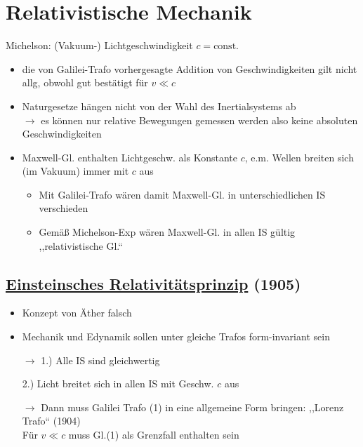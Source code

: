 \documentclass[titlepage,12pt,a4paper,ngerman]{report}
\newcommand{\tx}[1]{\textrm{#1}}
\newcommand{\const}{\tx{const.}}
\begin{document}

\section{Relativistische Mechanik}
Michelson: (Vakuum-) Lichtgeschwindigkeit $ c = \const $
\begin{itemize}
	\item die von Galilei-Trafo vorhergesagte Addition von Geschwindigkeiten gilt nicht allg, obwohl gut bestätigt für $ v \ll c $
	\item Naturgesetze hängen nicht von der Wahl des Inertialsystems ab\\
	$ \rightarrow $ es können nur relative Bewegungen gemessen werden also keine absoluten Geschwindigkeiten
	\item Maxwell-Gl. enthalten Lichtgeschw. als Konstante $ c $, e.m. Wellen breiten sich (im Vakuum) immer mit $ c $ aus
	\begin{itemize}
		\item Mit Galilei-Trafo wären damit Maxwell-Gl. in unterschiedlichen IS verschieden
		\item Gemäß Michelson-Exp wären Maxwell-Gl. in allen IS gültig ,,relativistische Gl.``
	\end{itemize}
\end{itemize}
\subsection{\underline{Einsteinsches Relativitätsprinzip} (1905)}
\begin{itemize}
	\item Konzept von Äther falsch
	\item Mechanik und Edynamik sollen unter gleiche Trafos form-invariant sein
\end{itemize}
\begin{enumerate}
	\item[$ \rightarrow $ 1.)] Alle IS sind gleichwertig
	\item[2.)] Licht breitet sich in allen IS mit Geschw. $ c $ aus
\end{enumerate}
\begin{enumerate}
	\item[$ \rightarrow $ \phantom{1.)}] 	Dann muss Galilei Trafo (1) in eine allgemeine Form bringen: ,,Lorenz Trafo`` (1904)\\
	Für $ v \ll c $ muss Gl.(1) als Grenzfall enthalten sein
\end{enumerate}
\end{document}
